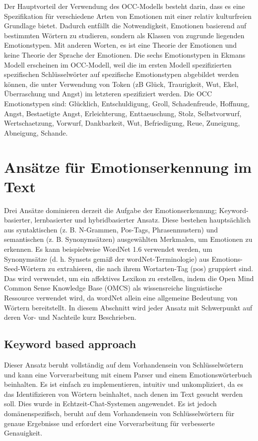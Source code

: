 \documentclass[conference]{IEEEtran}
\begin{document}
Der Hauptvorteil der Verwendung des OCC-Modells besteht darin, dass es eine Spezifikation für verschiedene Arten von Emotionen mit einer relativ kulturfreien Grundlage bietet. Dadurch entfällt die Notwendigkeit, Emotionen basierend auf bestimmten Wörtern zu studieren, sondern als Klassen von zugrunde liegenden Emotionstypen. Mit anderen Worten, es ist eine Theorie der Emotionen
und keine Theorie der Sprache der Emotionen. Die sechs Emotionstypen in Ekmans Modell erscheinen im OCC-Modell, weil die im ersten Modell spezifizierten spezifischen Schlüsselwörter auf spezifische Emotionstypen abgebildet werden können, die unter Verwendung von Token (zB Glück, Traurigkeit, Wut, Ekel, Überraschung und Angst) im letzteren spezifiziert werden. Die OCC
Emotionstypen sind: Glücklich, Entschuldigung, Groll, Schadenfreude, Hoffnung, Angst, Bestaetigte Angst, Erleichterung, Enttaeuschung, Stolz, Selbstvorwurf, Wertschaetzung, Vorwurf, Dankbarkeit, Wut, Befriedigung, Reue, Zuneigung, Abneigung, Schande.\cite{b2}

\section{Ansätze für Emotionserkennung im Text}
Drei Ansätze dominieren derzeit die Aufgabe der Emotionserkennung; Keyword-basierter, lernbasierter und hybridbasierter Ansatz. Diese bestehen hauptsächlich aus syntaktischen (z. B. N-Grammen, Pos-Tags, Phrasenmustern) und semantischen (z. B. Synonymsätzen) ausgewählten Merkmalen, um Emotionen zu erkennen. Es kann beispielweise WordNet 1.6 verwendet werden, um
Synonymsätze (d. h. Synsets gemäß der wordNet-Terminologie) aus Emotions-Seed-Wörtern zu extrahieren, die nach ihrem Wortarten-Tag (pos) gruppiert sind. Das wird verwendet, um ein affektives Lexikon zu erstellen, indem die Open Mind Common Sense Knowledge Base (OMCS) als wissensreiche linguistische Ressource verwendet wird, da wordNet allein eine allgemeine
Bedeutung von Wörtern bereitstellt. In diesem Abschnitt wird jeder Ansatz mit Schwerpunkt auf deren Vor- und Nachteile kurz Beschrieben.\cite{b2}

\subsection{Keyword based approach}
Dieser Ansatz beruht vollständig auf dem Vorhandensein von Schlüsselwörtern und kann eine Vorverarbeitung mit einem Parser und einem Emotionswörterbuch beinhalten. Es ist einfach zu implementieren, intuitiv und unkompliziert, da es das Identifizieren von Wörtern beinhaltet, nach denen im Text gesucht werden soll. Dies wurde in Echtzeit-Chat-Systemen angewendet. Es ist jedoch domänenspezifisch, beruht auf dem Vorhandensein von Schlüsselwörtern für genaue Ergebnisse und erfordert eine Vorverarbeitung für verbesserte Genauigkeit.\cite{b2}
\end{document}

